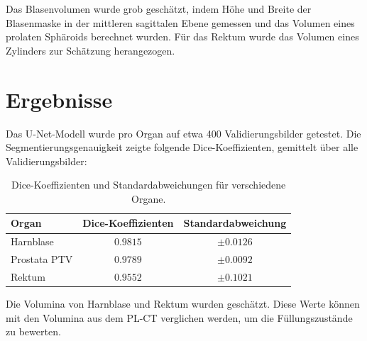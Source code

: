 \documentclass{article}
\begin{document}
Das Blasenvolumen wurde grob geschätzt, indem Höhe und Breite der Blasenmaske in
der mittleren sagittalen Ebene gemessen und das Volumen eines prolaten Sphäroids
berechnet wurden. Für das Rektum wurde das Volumen eines Zylinders zur Schätzung
herangezogen.


\section{Ergebnisse}
Das U-Net-Modell wurde pro Organ auf etwa 400 Validierungsbilder getestet. Die
Segmentierungsgenauigkeit zeigte folgende Dice-Koeffizienten, gemittelt über
alle Validierungsbilder:


\begin{table}[H]
  \centering
  \begin{tabular}{lcc} %
    \toprule
        Organ & Dice-Koeffizienten & Standardabweichung \\
    \midrule
        Harnblase       & $0.9815$ & $\pm 0.0126$ \\
        Prostata PTV    & $0.9789$ & $\pm 0.0092$ \\
        Rektum          & $0.9552$ & $\pm 0.1021$ \\
    \bottomrule
  \end{tabular}
  \caption{Dice-Koeffizienten und Standardabweichungen für verschiedene Organe.}
  \label{tab:dice_coefficients}
\end{table}

Die Volumina von Harnblase und Rektum wurden geschätzt. Diese Werte können mit
den Volumina aus dem PL-CT verglichen werden, um die Füllungszustände zu
bewerten.
\end{document}
